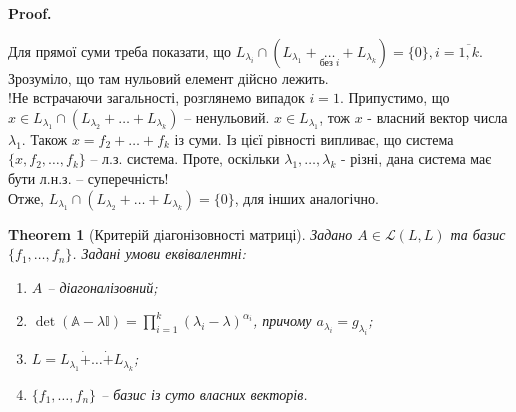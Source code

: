 \documentclass[a4paper, 10pt]{article}
\makeatletter
\theoremstyle{theoremdd}
\newtheorem{theorem}{Theorem}[subsection]
\renewenvironment{proof}[1][Proof.\\]{\par
\pushQED{\hfill \qed}%
\normalfont \topsep6\p@\@plus6\p@\relax
\trivlist
\item\relax
{\bfseries
#1\@addpunct{.}}\hspace\labelsep\ignorespaces
}{%
\popQED\endtrivlist\@endpefalse
}
\makeatother
\begin{document}
\begin{proof}
Для прямої суми треба показати, що $L_{\lambda_i} \cap \left( L_{\lambda_1} + \underset{\text{без }i}{\dots} + L_{\lambda_k} \right) = \{0\}, i = \overline{1,k}$. Зрозуміло, що там нульовий елемент дійсно лежить.\\
!Не встрачаючи загальності, розглянемо випадок $i = 1$. Припустимо, що $x \in L_{\lambda_1} \cap (L_{\lambda_2} + \dots + L_{\lambda_k})$ -- ненульовий. $x \in L_{\lambda_1}$, тож $x$ - власний вектор числа $\lambda_1$. Також $x = f_2 + \dots + f_k$ із суми. Із цієї рівності випливає, що система $\{x,f_2,\dots,f_k\}$ -- л.з. система. Проте, оскільки $\lambda_1,\dots,\lambda_k$ - різні, дана система має бути л.н.з. -- суперечність!\\
Отже, $L_{\lambda_1} \cap (L_{\lambda_2} + \dots + L_{\lambda_k}) = \{0\}$, для інших аналогічно.
\end{proof}

\begin{theorem}[Критерій діагонізовності матриці]
Задано $A \in \mathcal{L}(L,L)$ та базис $\{f_1,\dots,f_n\}$. Задані умови еквівалентні:
\begin{enumerate}[nosep,wide=0pt,label={\arabic*)}]
\item $A$ -- діагоналізовний;
\item $\det (\mathbb{A}-\lambda \mathbb{I}) = \displaystyle\prod_{i=1}^k (\lambda_i - \lambda)^{\alpha_i}$, причому $a_{\lambda_i} = g_{\lambda_i}$;
\item $L = L_{\lambda_1} \dot{+} \dots \dot{+} L_{\lambda_k}$;
\item $\{f_1,\dots,f_n\}$ -- базис із суто власних векторів.
\end{enumerate}
\end{theorem}
\end{document}
